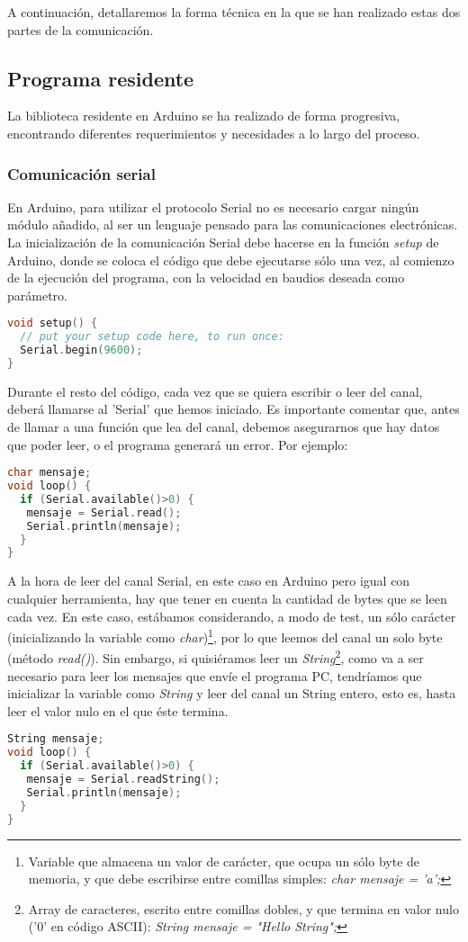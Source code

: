 A continuación, detallaremos la forma técnica en la que se han realizado estas dos partes de la comunicación. 
\subsection{Programa residente}\label{subsec:residente}
La biblioteca residente en Arduino se ha realizado de forma progresiva, encontrando diferentes requerimientos y necesidades a lo largo del proceso. 
\subsubsection{Comunicación serial}\label{subsubsec:comunicacionArduino}
En Arduino, para utilizar el protocolo Serial no es necesario cargar ningún módulo añadido, al ser un lenguaje pensado para las comunicaciones electrónicas. La inicialización de la comunicación Serial debe hacerse en la función \textit{setup} de Arduino, donde se coloca el código que debe ejecutarse sólo una vez, al comienzo de la ejecución del programa, con la velocidad en baudios deseada como parámetro.
\begin{lstlisting}[language=C,caption={Inicialización del protocolo Serial},captionpos=b]
void setup() {
  // put your setup code here, to run once:
  Serial.begin(9600);
}
\end{lstlisting}
Durante el resto del código, cada vez que se quiera escribir o leer del canal, deberá llamarse al 'Serial' que hemos iniciado. Es importante comentar que, antes de llamar a una función que lea del canal, debemos asegurarnos que hay datos que poder leer, o el programa generará un error. Por ejemplo:
\begin{lstlisting}[language=C,caption={eco en Arduino: lee del canal Serial y lo escribe},captionpos=b]
char mensaje;
void loop() {
  if (Serial.available()>0)	{
   mensaje = Serial.read();   
   Serial.println(mensaje);
  }
}
\end{lstlisting}
A la hora de leer del canal Serial, en este caso en Arduino pero igual con cualquier herramienta, hay que tener en cuenta la cantidad de bytes que se leen cada vez. En este caso, estábamos considerando, a modo de test, un sólo carácter (inicializando la variable como \textit{char})\footnote{Variable que almacena un valor de carácter, que ocupa un sólo byte de memoria, y que debe escribirse entre comillas simples:\textit{ char mensaje = 'a';}}, por lo que leemos del canal un solo byte (método \textit{read()}). Sin embargo, si quisiéramos leer un \textit{String}\footnote{Array de caracteres, escrito entre comillas dobles, y que termina en valor nulo ('0' en código ASCII): \textit{String mensaje =  "Hello String";}}, como va a ser necesario para leer los mensajes que envíe el programa PC, tendríamos que inicializar la variable como \textit{String} y leer del canal un String entero, esto es, hasta leer el valor nulo en el que éste termina.
\begin{lstlisting}[language=C,caption={eco en Arduino con un Strin},captionpos=b]
String mensaje;
void loop() {
  if (Serial.available()>0) {
   mensaje = Serial.readString();     
   Serial.println(mensaje);
  }
}
\end{lstlisting}

